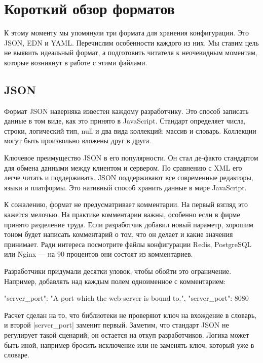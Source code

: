\section{Короткий обзор форматов}

К этому моменту мы упомянули три формата для хранения конфигурации. Это JSON,
EDN и YAML. Перечислим особенности каждого из них. Мы ставим цель не выявить
идеальный формат, а подготовить читателя к неочевидным моментам, которые
возникнут в работе с этими файлами.

\subsection{JSON}

Формат JSON наверняка известен каждому разработчику. Это способ записать данные
в том виде, как это принято в JavaScript. Стандарт определяет числа, строки,
логический тип, null и два вида коллекций: массив и словарь. Коллекции могут
быть произвольно вложены друг в друга.

Ключевое преимущество JSON в его популярности. Он стал де-факто стандартом для
обмена данными между клиентом и сервером. По сравнению с XML его легче читать и
поддерживать. JSON поддерживают все современные редакторы, языки и
платформы. Это нативный способ хранить данные в мире JavaScript.

К сожалению, формат не предусматривает комментарии. На первый взгляд это кажется
мелочью. На практике комментарии важны, особенно если в фирме принято разделение
труда. Если разработчик добавил новый параметр, хорошим тоном будет написать
комментарий о том, что он делает и какие значения принимает. Ради интереса
посмотрите файлы конфигурации Redis, PostgreSQL или Nginx — на 90 процентов они
состоят из комментариев.

Разработчики придумали десятки уловок, чтобы обойти это ограничение. Например,
добавлять над каждым полем одноименное с комментарием:

\begin{code}
{
    "server_port": "A port which the web-server is bound to.",
    "server_port": 8080
}
\end{code}

Расчет сделан на то, что библиотеки не проверяют ключ на вхождение в словарь, и
второй \spverb|server_port| заменит первый. Заметим, что стандарт JSON не регулирует
такой сценарий; он остается на откуп разработчиков. Логика может быть иной,
например бросить исключение или не заменять ключ, который уже в словаре.

